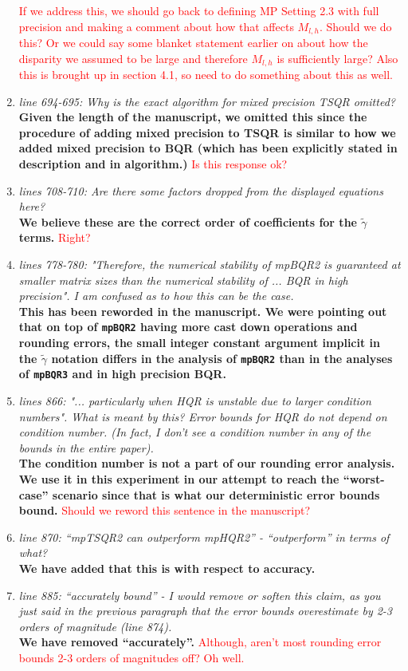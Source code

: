 \documentclass[final,onefignum,onetabnum]{siamart190516}
\newcommand{\red}[1]{\textcolor{red}{#1}}
\begin{document}
\begin{enumerate}
    \red{If we address this, we should go back to defining MP Setting 2.3 with full precision and making a comment about how that affects $M_{l,h}$. Should we do this? Or we could say some blanket statement earlier on about how the disparity we assumed to be large and therefore $M_{l,h}$ is sufficiently large? Also this is brought up in section 4.1, so need to do something about this as well.}
    \item {\it line 694-695: Why is the exact algorithm for mixed precision TSQR omitted? }\\
    {\bf Given the length of the manuscript, we omitted this since the procedure of adding mixed precision to TSQR is similar to how we added mixed precision to BQR (which has been explicitly stated in description and in algorithm.)} \red{Is this response ok?}
    \item {\it lines 708-710: Are there some factors dropped from the displayed equations here? }\\
    {\bf We believe these are the correct order of coefficients for the $\tilde{\gamma}$ terms.} \red{ Right?}
    \item {\it lines 778-780: "Therefore, the numerical stability of mpBQR2 is guaranteed at smaller matrix sizes than the numerical stability of ... BQR in high precision". I am confused as to how this can be the case. }\\
    {\bf This has been reworded in the manuscript. We were pointing out that on top of {\tt mpBQR2} having more cast down operations and rounding errors, the small integer constant argument implicit in the $\tilde{\gamma}$ notation differs in the analysis of {\tt mpBQR2} than in the analyses of {\tt mpBQR3} and in high precision BQR.}
    \item {\it lines 866: "... particularly when HQR is unstable due to larger condition numbers". What is meant by this? Error bounds for HQR do not depend on condition number. (In fact, I don't see a condition number in any of the bounds in the entire paper). }\\
    {\bf The condition number is not a part of our rounding error analysis. We use it in this experiment in our attempt to reach the ``worst-case'' scenario since that is what our deterministic error bounds bound. } \red{Should we reword this sentence in the manuscript?}
    \item {\it line 870: ``mpTSQR2 can outperform mpHQR2'' - ``outperform'' in terms of what? } \\
    {\bf We have added that this is with respect to accuracy.}
    \item {\it line 885: ``accurately bound'' - I would remove or soften this claim, as you just said in the previous paragraph that the error bounds overestimate by 2-3 orders of magnitude (line 874).}\\
    {\bf We have removed ``accurately''.} \red{Although, aren't most rounding error bounds 2-3 orders of magnitudes off? Oh well.}
\end{enumerate}
\end{document}
